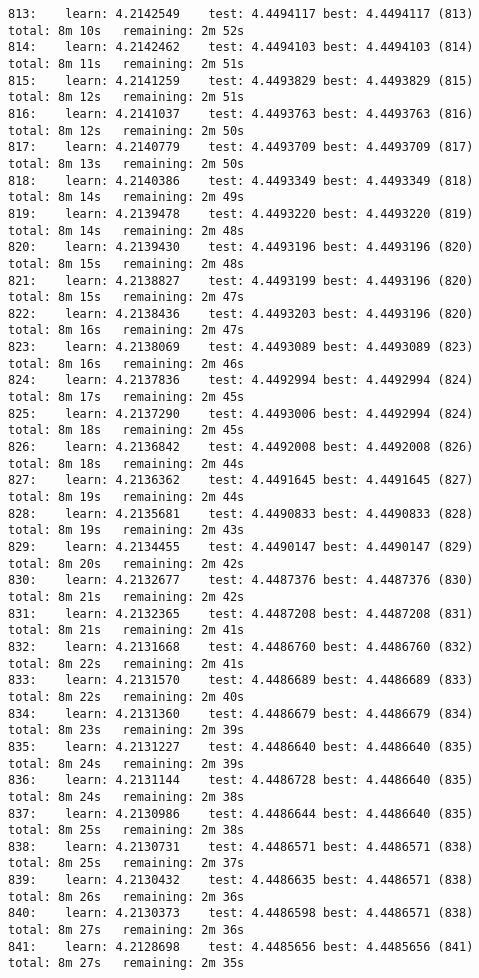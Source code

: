 \documentclass[11pt]{article}
\begin{document}
\begin{Verbatim}[commandchars=\\\{\}]
813:	learn: 4.2142549	test: 4.4494117	best: 4.4494117 (813)	total: 8m 10s	remaining: 2m 52s
814:	learn: 4.2142462	test: 4.4494103	best: 4.4494103 (814)	total: 8m 11s	remaining: 2m 51s
815:	learn: 4.2141259	test: 4.4493829	best: 4.4493829 (815)	total: 8m 12s	remaining: 2m 51s
816:	learn: 4.2141037	test: 4.4493763	best: 4.4493763 (816)	total: 8m 12s	remaining: 2m 50s
817:	learn: 4.2140779	test: 4.4493709	best: 4.4493709 (817)	total: 8m 13s	remaining: 2m 50s
818:	learn: 4.2140386	test: 4.4493349	best: 4.4493349 (818)	total: 8m 14s	remaining: 2m 49s
819:	learn: 4.2139478	test: 4.4493220	best: 4.4493220 (819)	total: 8m 14s	remaining: 2m 48s
820:	learn: 4.2139430	test: 4.4493196	best: 4.4493196 (820)	total: 8m 15s	remaining: 2m 48s
821:	learn: 4.2138827	test: 4.4493199	best: 4.4493196 (820)	total: 8m 15s	remaining: 2m 47s
822:	learn: 4.2138436	test: 4.4493203	best: 4.4493196 (820)	total: 8m 16s	remaining: 2m 47s
823:	learn: 4.2138069	test: 4.4493089	best: 4.4493089 (823)	total: 8m 16s	remaining: 2m 46s
824:	learn: 4.2137836	test: 4.4492994	best: 4.4492994 (824)	total: 8m 17s	remaining: 2m 45s
825:	learn: 4.2137290	test: 4.4493006	best: 4.4492994 (824)	total: 8m 18s	remaining: 2m 45s
826:	learn: 4.2136842	test: 4.4492008	best: 4.4492008 (826)	total: 8m 18s	remaining: 2m 44s
827:	learn: 4.2136362	test: 4.4491645	best: 4.4491645 (827)	total: 8m 19s	remaining: 2m 44s
828:	learn: 4.2135681	test: 4.4490833	best: 4.4490833 (828)	total: 8m 19s	remaining: 2m 43s
829:	learn: 4.2134455	test: 4.4490147	best: 4.4490147 (829)	total: 8m 20s	remaining: 2m 42s
830:	learn: 4.2132677	test: 4.4487376	best: 4.4487376 (830)	total: 8m 21s	remaining: 2m 42s
831:	learn: 4.2132365	test: 4.4487208	best: 4.4487208 (831)	total: 8m 21s	remaining: 2m 41s
832:	learn: 4.2131668	test: 4.4486760	best: 4.4486760 (832)	total: 8m 22s	remaining: 2m 41s
833:	learn: 4.2131570	test: 4.4486689	best: 4.4486689 (833)	total: 8m 22s	remaining: 2m 40s
834:	learn: 4.2131360	test: 4.4486679	best: 4.4486679 (834)	total: 8m 23s	remaining: 2m 39s
835:	learn: 4.2131227	test: 4.4486640	best: 4.4486640 (835)	total: 8m 24s	remaining: 2m 39s
836:	learn: 4.2131144	test: 4.4486728	best: 4.4486640 (835)	total: 8m 24s	remaining: 2m 38s
837:	learn: 4.2130986	test: 4.4486644	best: 4.4486640 (835)	total: 8m 25s	remaining: 2m 38s
838:	learn: 4.2130731	test: 4.4486571	best: 4.4486571 (838)	total: 8m 25s	remaining: 2m 37s
839:	learn: 4.2130432	test: 4.4486635	best: 4.4486571 (838)	total: 8m 26s	remaining: 2m 36s
840:	learn: 4.2130373	test: 4.4486598	best: 4.4486571 (838)	total: 8m 27s	remaining: 2m 36s
841:	learn: 4.2128698	test: 4.4485656	best: 4.4485656 (841)	total: 8m 27s	remaining: 2m 35s

\end{Verbatim}
\end{document}
